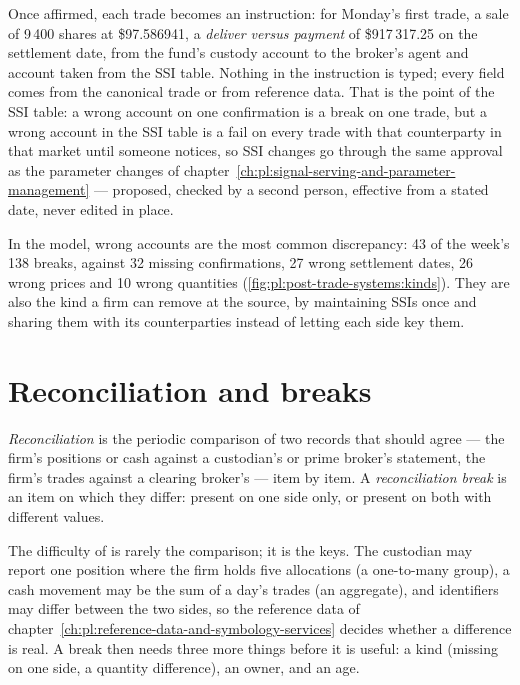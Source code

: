 Once affirmed, each trade becomes an instruction: for Monday's first trade, a sale of 9\,400 shares at \$97.586941, a \emph{deliver versus
payment} of \$917\,317.25 on the settlement date, from the fund's custody account to the broker's agent and account taken from the SSI table.
Nothing in the instruction is typed; every field comes from the canonical trade or from reference data. That is the point of the SSI table: a
wrong account on one confirmation is a break on one trade, but a wrong account in the SSI table is a fail on every trade with that
counterparty in that market until someone notices, so SSI changes go through the same approval as the parameter changes of
chapter~\ref{ch:pl:signal-serving-and-parameter-management} --- proposed, checked by a second person, effective from a stated date, never
edited in place.

In the model, wrong accounts are the most common discrepancy: 43 of the week's 138 breaks, against 32 missing confirmations, 27 wrong
settlement dates, 26 wrong prices and 10 wrong quantities (\cref{fig:pl:post-trade-systems:kinds}). They are also the kind a firm can remove at
the source, by maintaining SSIs once and sharing them with its counterparties instead of letting each side key them.

\section{Reconciliation and breaks}

\begin{definition}\label{def:pl:post-trade-systems:recon}
\emph{Reconciliation} is the periodic comparison of two records that should agree --- the firm's positions or cash
against a custodian's or prime broker's statement, the firm's trades against a clearing broker's --- item by item. A \emph{reconciliation
break} is an item on which they differ: present on one side only, or present on both with different values.
\end{definition}

\label{lst:pl:post-trade-systems:recon}

The difficulty of  is rarely the comparison; it is the keys. The custodian may report one position where the firm holds five
allocations (a one-to-many group), a cash movement may be the sum of a day's trades (an aggregate), and identifiers may differ between the two
sides, so the reference data of chapter~\ref{ch:pl:reference-data-and-symbology-services} decides whether a difference is real. A break then
needs three more things before it is useful: a kind (missing on one side, a quantity difference), an owner, and an age.


